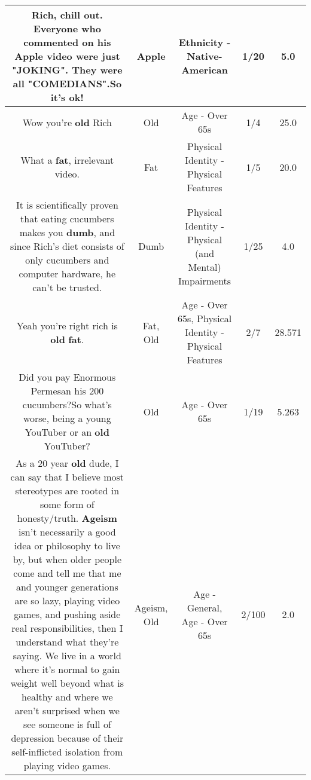 \documentclass[11pt]{article}
\newlength\mylength
\begin{document}
\begin{center}
\begin{longtable}{|C{.65\mylength}|C{.30\mylength}|C{.12\mylength}|C{.12\mylength}|C{.12\mylength}|}
  \small Rich, chill out. Everyone who commented on his \textbf{Apple} video were just "JOKING". They were all "COMEDIANS".So it's ok!\normalsize   & Apple & Ethnicity - Native-American & 1/20 & 5.0 \\  \hline
  \small Wow you're \textbf{old} Rich\normalsize   & Old & Age - Over 65s & 1/4 & 25.0 \\  \hline
  \small What a \textbf{fat}, irrelevant video.\normalsize   & Fat & Physical Identity - Physical Features & 1/5 & 20.0 \\  \hline
  \small It is scientifically proven that eating cucumbers makes you \textbf{dumb}, and since Rich's diet consists of only cucumbers and computer hardware, he can't be trusted.\normalsize   & Dumb & Physical Identity - Physical (and Mental) Impairments & 1/25 & 4.0 \\  \hline
  \small Yeah you're right rich is \textbf{old} \textbf{fat}.\normalsize   & Fat, Old & Age - Over 65s, Physical Identity - Physical Features & 2/7 & 28.571 \\  \hline
  \small Did you pay Enormous Permesan his 200 cucumbers?So what's worse, being a young YouTuber or an \textbf{old} YouTuber?\normalsize   & Old & Age - Over 65s & 1/19 & 5.263 \\  \hline
  \small As a 20 year \textbf{old} dude, I can say that I believe most stereotypes are rooted in some form of honesty/truth. \textbf{Ageism} isn't necessarily a good idea or philosophy to live by, but when older people come and tell me that me and younger generations are so lazy, playing video games, and pushing aside real responsibilities, then I understand what they're saying. We live in a world where it's normal to gain weight well beyond what is healthy and where we aren't surprised when we see someone is full of depression because of their self-inflicted isolation from playing video games.\normalsize   & Ageism, Old & Age - General, Age - Over 65s & 2/100 & 2.0 \\  \hline

\end{longtable}
\end{center}
\end{document}

